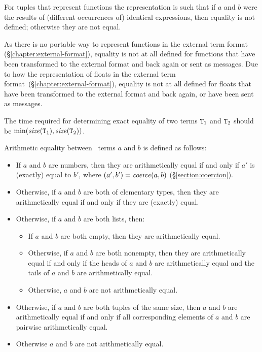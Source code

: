 \begin{itemize}
\begin{itemize}
\ifOld
For tuples that represent functions the representation is such that
if $a$ and $b$ were the results of (different occurrences of)
identical expressions, then equality is not defined; otherwise they are not equal.
\fi
\end{itemize}
\end{itemize}
\ifStd
As there is no portable way to represent functions in the external term format
(\S\ref{chapter:external-format}), equality is not at all defined for functions that
have been transformed to the external format and back again or sent as messages.
\fi
Due to how the representation of floats in the external term format\ifStd\else\
(\S\ref{chapter:external-format})\fi, equality is not at all defined for floats that
have been transformed to the external format and back again, or have been
sent as messages.

The time required for determining exact equality of two terms ${\tt{\sl T}}_1$ and
${\tt{\sl T}}_2$ should be $\min(\mathit{size}({\tt{\sl T}}_1),\mathit{size}({\tt{\sl T}}_2))$.

Arithmetic equality between \Erlang\ terms $a$ and $b$ is defined as follows:
\begin{itemize}
\item If $a$ and $b$ are numbers, then they are arithmetically equal
if and only if $a'$ is (exactly) equal to $b'$, where $(a',b')={\it coerce}(a,b)$
(\S\ref{section:coercion}).
\item Otherwise, if $a$ and $b$ are both of elementary types, then they
are arithmetically equal if and only if they are (exactly) equal.
\item Otherwise, if $a$ and $b$ are both lists, then:
\begin{itemize}
\item If $a$ and $b$ are both empty, then they are arithmetically equal.
\item Otherwise, if $a$ and $b$ are both nonempty, then they are arithmetically
equal if and only if the heads of $a$ and $b$ are arithmetically equal and the
tails of $a$ and $b$ are arithmetically equal.
\item Otherwise, $a$ and $b$ are not arithmetically equal.
\end{itemize}
\item Otherwise, if $a$ and $b$ are both tuples of the same size, then
$a$ and $b$ are arithmetically equal if and only if all corresponding elements
of $a$ and $b$ are pairwise arithmetically equal.
\item Otherwise $a$ and $b$ are not arithmetically equal.
\end{itemize}

